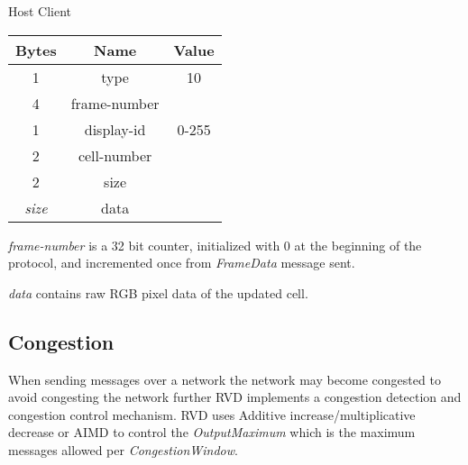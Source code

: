 \begin{center}
    Host \textrightarrow Client\\
    \begin{tabular}{|c|c|c|}
        \hline
        \textbf{Bytes} & \textbf{Name} & \textbf{Value} \\
        \hline
        1              & type          & 10             \\
        \hline
        4              & frame-number  &                \\
        \hline
        1              & display-id    & 0-255          \\
        \hline
        2              & cell-number   &                \\
        \hline
        2              & size          &                \\
        \hline
        \emph{size}    & data          &                \\
        \hline
    \end{tabular}
\end{center}

\emph{frame-number} is a 32 bit counter, initialized with 0 at the beginning of the protocol, and incremented once
from \emph{FrameData} message sent.

\emph{data} contains raw RGB pixel data of the updated cell.

\subsection{Congestion}

When sending messages over a network the network may become congested to avoid congesting the network further RVD
implements a congestion detection and congestion control mechanism. RVD uses Additive increase/multiplicative
decrease or AIMD to control the \emph{OutputMaximum} which is the maximum messages allowed per
\emph{CongestionWindow}.